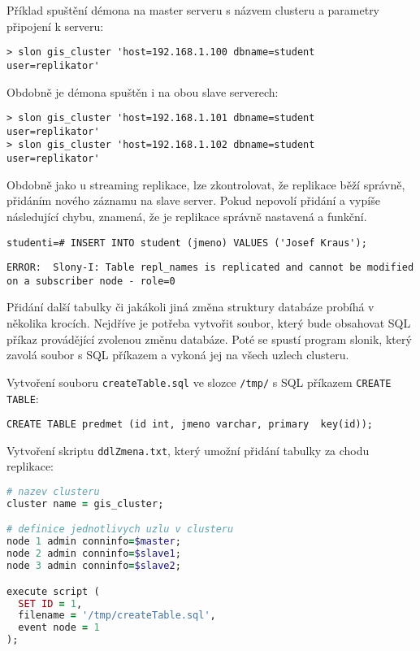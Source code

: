 Příklad spuštění démona na master serveru s názvem clusteru a parametry připojení k serveru:
\begin{lstlisting}
> slon gis_cluster 'host=192.168.1.100 dbname=student  user=replikator'
\end{lstlisting}
Obdobně je démona spuštěn i na obou slave serverech:
\begin{lstlisting}
> slon gis_cluster 'host=192.168.1.101 dbname=student  user=replikator'
> slon gis_cluster 'host=192.168.1.102 dbname=student  user=replikator'
\end{lstlisting}

Obdobně jako u streaming replikace, lze zkontrolovat, že replikace běží správně, přidáním nového záznamu na slave server. Pokud nepovolí přidání a vypíše následující chybu, znamená, že je replikace správně nastavená a funkční.

\begin{lstlisting}
studenti=# INSERT INTO student (jmeno) VALUES ('Josef Kraus');
\end{lstlisting}
\begin{lstlisting}[identifierstyle=\color{black},stringstyle=\color{black},keywordstyle=\color{black}]
ERROR:  Slony-I: Table repl_names is replicated and cannot be modified on a subscriber node - role=0
\end{lstlisting}

Přidání další tabulky či jakákoli jiná změna struktury databáze probíhá v několika krocích. Nejdříve je potřeba vytvořit soubor, který bude obsahovat SQL příkaz provádějící zvolenou změnu databáze. Poté se spustí program slonik, který zavolá soubor s SQL příkazem a vykoná jej na všech uzlech clusteru. 

Vytvoření souboru \texttt{createTable.sql} ve slozce \texttt{/tmp/} s SQL příkazem \texttt{CREATE TABLE}:

\begin{lstlisting}
CREATE TABLE predmet (id int, jmeno varchar, primary  key(id));
\end{lstlisting}

Vytvoření skriptu \texttt{ddlZmena.txt}, který umožní přidání tabulky za chodu replikace:

\begin{lstlisting}[language=ruby]
# nazev clusteru
cluster name = gis_cluster;

# definice jednotlivych uzlu v clusteru
node 1 admin conninfo=$master;
node 2 admin conninfo=$slave1;
node 3 admin conninfo=$slave2;

execute script (
  SET ID = 1,
  filename = '/tmp/createTable.sql',
  event node = 1
);

\end{lstlisting}

